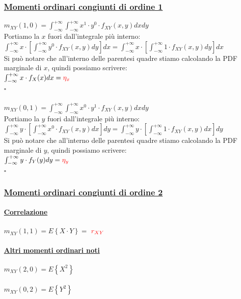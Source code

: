 \documentclass{article}
\begin{document}
\subsubsection{\underline{Momenti ordinari congiunti di ordine 1}}
$m_{XY}(1,0) = \int_{-\infty}^{+\infty} \int_{-\infty}^{+\infty} x^1 \cdot y^0 \cdot f_{XY}(x,y) dx dy$ \\
Portiamo la $x$ fuori dall'integrale più interno: \\
$\int_{-\infty}^{+\infty} x \cdot \left[ \int_{-\infty}^{+\infty} y^0 \cdot f_{XY}(x,y) dy \right] dx = \int_{-\infty}^{+\infty} x \cdot \left[ \int_{-\infty}^{+\infty} 1 \cdot f_{XY}(x,y) dy \right] dx$ \\
Si può notare che all'interno delle parentesi quadre stiamo calcolando la PDF marginale di $x$, quindi possiamo scrivere: \\
$\int_{-\infty}^{+\infty} x \cdot f_X(x) dx = {\color{red}\eta_x}$ \\
\hspace*{0pt}\hfill $\square$ \\ \\
$m_{XY}(0,1) = \int_{-\infty}^{+\infty} \int_{-\infty}^{+\infty} x^0 \cdot y^1 \cdot f_{XY}(x,y) dx dy$ \\
Portiamo la $y$ fuori dall'integrale più interno: \\
$\int_{-\infty}^{+\infty} y \cdot \left[ \int_{-\infty}^{+\infty} x^0 \cdot f_{XY}(x,y) dx \right] dy = \int_{-\infty}^{+\infty} y \cdot \left[ \int_{-\infty}^{+\infty} 1 \cdot f_{XY}(x,y) dx \right] dy$ \\
Si può notare che all'interno delle parentesi quadre stiamo calcolando la PDF marginale di $y$, quindi possiamo scrivere: \\
$\int_{-\infty}^{+\infty} y \cdot f_Y(y) dy = {\color{red}\eta_y}$ \\
\hspace*{0pt}\hfill $\square$
\subsubsection{\underline{Momenti ordinari congiunti di ordine 2}}
\paragraph{\underline{Correlazione}}
$m_{XY}(1,1) = E \left\{ X \cdot Y \right\} =$ $ \color{red} r_{XY}$
\paragraph{\underline{Altri momenti ordinari noti}}
$m_{XY}(2,0) = E\left\{ X^2 \right\}$ \\ \\
$m_{XY}(0,2) = E\left\{ Y^2 \right\}$
\end{document}
